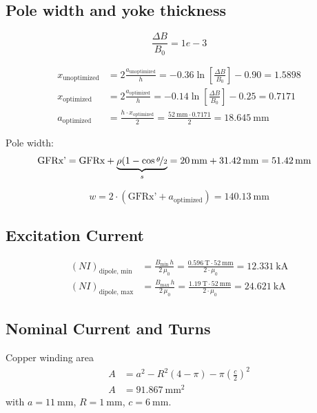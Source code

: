 \documentclass[10pt,a4paper,noendnumber=true]{scrartcl}
\begin{document}
\subsection{Pole width and yoke thickness}

\begin{equation}
    \frac{\Delta B}{B_0} = {1e-3}
\end{equation}

\begin{align}
    x_\text{unoptimized} &= 2\frac{a_\text{unoptimized}}{h} = -0.36 \ln\left[\frac{\Delta B}{B_0}\right] - 0.90 = 1.5898 \\
    x_\text{optimized} &= 2\frac{a_\text{optimized}}{h} = -0.14 \ln\left[\frac{\Delta B}{B_0}\right] -0.25 = 0.7171 \\
    a_\text{optimized} &= \frac{h\cdot x_\text{optimized}}{2} = \frac{\SI{52}{\mm} \cdot 0.7171}{2} = \SI{18.645}{\mm}
\end{align}

Pole width:
\begin{align}
    \text{GFRx'} = \text{GFRx} + \underbrace{\rho(1-\cos \nicefrac{\theta}{2}}_s = \SI{20}{\mm} + \SI{31.42}{\mm} 
    &= \SI{51.42}{\mm}
\end{align}

\begin{equation}
    w = 2\cdot \left(\text{GFRx'} + a_\text{optimized}\right) = \SI{140.13}{\mm}
\end{equation}

\subsection{Excitation Current}
\begin{align}
    (NI)_\text{dipole, min} &= \frac{B_\text{min}\,h}{2\,\mu_0} = \frac{\SI{0.596}{\tesla} \cdot \SI{52}{\mm}}{2\cdot \mu_0} = \SI{12.331}{\kilo\ampere}\\
    (NI)_\text{dipole, max} &= \frac{B_\text{max}\,h}{2\,\mu_0} = \frac{\SI{1.19}{\tesla} \cdot \SI{52}{\mm}}{2\cdot \mu_0} = \SI{24.621}{\kilo\ampere}
\end{align}

\subsection{Nominal Current and Turns}
Copper winding area
\begin{align}
A &= a^2- R^2 (4-\pi) - \pi \left(\frac{c}{2}\right)^2\\
A &= \SI{91.867}{\mm\squared}
\end{align}
with $a=\SI{11}{\mm}$, $R=\SI{1}{\mm}$, $c=\SI{6}{\mm}$.
\end{document}

